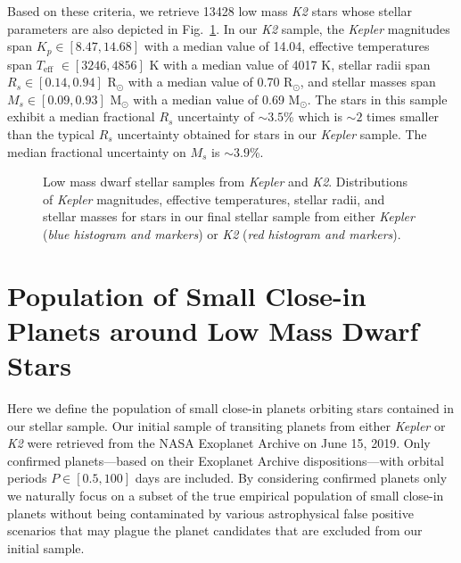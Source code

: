 \documentclass[twocolumn]{emulateapj}
\newcommand{\kepler}[1]{\emph{Kepler}#1}
\newcommand{\ktwo}[1]{\emph{K2}#1}
\newcommand{\teff}[1]{$T_{\text{eff}}$#1}
\begin{document}
\noindent Based on these criteria, we retrieve 13428 low mass \ktwo{} stars whose
stellar parameters are also depicted in Fig.~\ref{fig:stars}.
In our \ktwo{} sample, the \kepler{} magnitudes span $K_p \in [8.47, 14.68]$ with a median value of 14.04,
effective temperatures span \teff{} $\in [3246, 4856]$ K with a median value of 4017 K,
stellar radii span $R_s \in [0.14, 0.94]$ R$_{\odot}$ with a median value of 0.70 R$_{\odot}$, and
stellar masses span $M_s \in [0.09, 0.93]$ M$_{\odot}$ with a median value of 0.69 M$_{\odot}$.
The stars in this sample exhibit a median fractional $R_s$ uncertainty of $\sim 3.5$\% which is $\sim 2$
times smaller than the typical $R_s$ uncertainty obtained for stars in our \kepler{} sample.
The median fractional uncertainty on $M_s$ is $\sim 3.9$\%.

\begin{figure}
  \centering
  \caption{Low mass dwarf stellar samples from \kepler{} and \ktwo{.} Distributions of \kepler{} magnitudes,
    effective temperatures, stellar radii, and stellar masses for stars in our final stellar sample from either
    \kepler{} (\emph{blue histogram and markers}) or \ktwo{} (\emph{red histogram and markers}).}
  \label{fig:stars}
\end{figure}


\section{Population of Small Close-in Planets around Low Mass Dwarf Stars} \label{sect:planets}
Here we define the population of small close-in planets orbiting stars contained in our stellar sample.
Our initial sample of transiting planets from either \kepler{} or \ktwo{} were retrieved from the
NASA Exoplanet Archive \citep{akeson13} on June 15, 2019. Only confirmed
planets---based on their Exoplanet Archive dispositions---with orbital periods
$P\in [0.5,100]$ days are included. By considering confirmed
planets only we naturally focus on a subset of the true empirical population of small close-in planets
without being contaminated by various astrophysical false positive scenarios that may plague the planet
candidates that are excluded from our initial sample.
\end{document}

